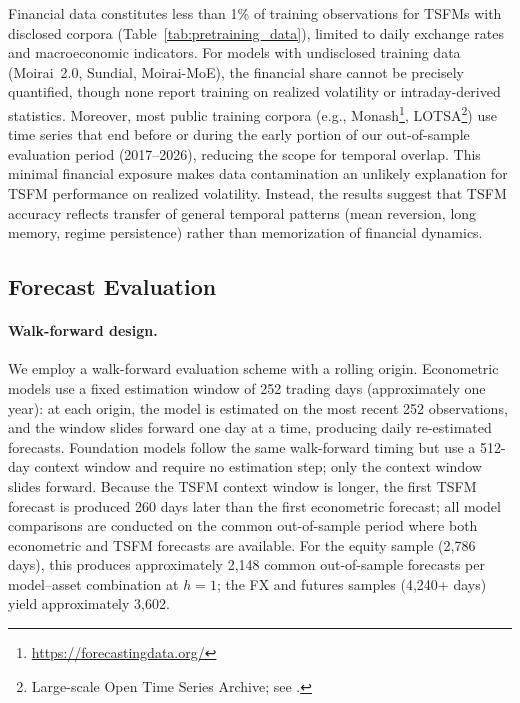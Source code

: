 \documentclass[12pt]{article}
\begin{document}


Financial data constitutes less than 1\% of training observations for TSFMs with disclosed corpora (Table~\ref{tab:pretraining_data}), limited to daily exchange rates and macroeconomic indicators. For models with undisclosed training data (Moirai~2.0, Sundial, Moirai-MoE), the financial share cannot be precisely quantified, though none report training on realized volatility or intraday-derived statistics. Moreover, most public training corpora (e.g., Monash\footnote{\url{https://forecastingdata.org/}}, LOTSA\footnote{Large-scale Open Time Series Archive; see \citet{woo2024moirai}.}) use time series that end before or during the early portion of our out-of-sample evaluation period (2017--2026), reducing the scope for temporal overlap. This minimal financial exposure makes data contamination an unlikely explanation for TSFM performance on realized volatility. Instead, the results suggest that TSFM accuracy reflects transfer of general temporal patterns (mean reversion, long memory, regime persistence) rather than memorization of financial dynamics.

\subsection{Forecast Evaluation}
\label{subsec:evaluation}

\paragraph{Walk-forward design.}
We employ a walk-forward evaluation scheme with a rolling origin. Econometric models use a fixed estimation window of 252 trading days (approximately one year): at each origin, the model is estimated on the most recent 252 observations, and the window slides forward one day at a time, producing daily re-estimated forecasts. Foundation models follow the same walk-forward timing but use a 512-day context window and require no estimation step; only the context window slides forward. Because the TSFM context window is longer, the first TSFM forecast is produced 260 days later than the first econometric forecast; all model comparisons are conducted on the common out-of-sample period where both econometric and TSFM forecasts are available. For the equity sample (2,786 days), this produces approximately 2,148 common out-of-sample forecasts per model--asset combination at $h = 1$; the FX and futures samples (4,240+ days) yield approximately 3,602.
\end{document}
